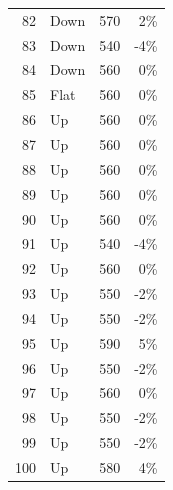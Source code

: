 \documentclass{scrartcl}
\begin{document}
\begin{longtable}{|r|l|r|r|}
		82    & Down  & 570   & 2\%     \\
		83    & Down  & 540   & -4\%    \\
		84    & Down  & 560   & 0\%     \\
		85    & Flat  & 560   & 0\%     \\
		86    & Up    & 560   & 0\%     \\
		87    & Up    & 560   & 0\%     \\
		88    & Up    & 560   & 0\%     \\
		89    & Up    & 560   & 0\%     \\
		90    & Up    & 560   & 0\%     \\
		91    & Up    & 540   & -4\%    \\
		92    & Up    & 560   & 0\%     \\
		93    & Up    & 550   & -2\%    \\
		94    & Up    & 550   & -2\%    \\
		95    & Up    & 590   & \cellcolor[rgb]{ 1,  .922,  .612}\textcolor[rgb]{ .612,  .341,  0}{5\%}   \\
		96    & Up    & 550   & -2\%    \\
		97    & Up    & 560   & 0\%     \\
		98    & Up    & 550   & -2\%    \\
		99    & Up    & 550   & -2\%    \\
		100   & Up    & 580   & 4\%     \\
\end{longtable}%

\pagebreak
\end{document}
